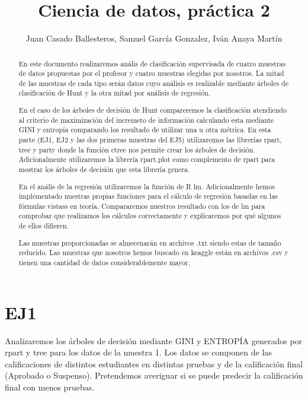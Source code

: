 \documentclass [a4paper] {article}
\title{Ciencia de datos, práctica 2}
\author{Juan Casado Ballesteros, Samuel García Gonzalez, Iván Anaya Martín}
\begin{document}
\maketitle

\begin{abstract}
En este documento realizaremos anális de clasificación supervisada de cuatro muestras de datos propuestas por el profesor y cuatro muestras elegidas por nosotros.
La mitad de las muestras de cada tipo serán datos cuyo análisis es realizable mediante árboles de clasificación de Hunt y la otra mitad por análisis de regresión.

En el caso de los árboles de decisión de Hunt compareremos la clasificación atendiendo al criterio de maximización del incremeto de información
calculando esta mediante GINI y entropía comparando los resultado de utilizar una u otra métrica.
En esta parte (EJ1, EJ2 y las dos primeras muestras del EJ5) utilizaremos las librerías rpart, tree y party donde la función ctree nos permite crear los árboles de decisión.
Adicionalmente utilizaremos la librería rpart.plot como complemento de rpart para mostrar los árboles de decisión que esta librería genera.

En el anális de la regresión utilizaremos la función de R lm.
Adicionalmente hemos implementado nuestras propias funciones para el cálculo de regresión basadas en las fórmulas vistass en teoría.
Compararemos nuestros resultado con los de lm para comprobar que realizamos los cálculos correctamente y explicaremos por qué algunos de ellos difieren.

Las muestras proporcionadas se almecenarán en archivos .txt siendo estas de tamaño reducido.
Las muestras que nosotros hemos buscado en keaggle están en archivos .csv y tienen una cantidad de datos considerablemente mayor.
\end{abstract}

\newpage
\tableofcontents


\newpage
\section{EJ1}
Analizaremos los árboles de decisión mediante GINI y ENTROPÍA generados por rpart y tree para los datos de la muestra 1.
Los datos se componen de las calificaciones de distintos estudiantes en distintas pruebas y de la calificación final (Aprobado o Suspenso).
Pretendemos averiguar si se puede predecir la calificación final con menos pruebas.
\end{document}
